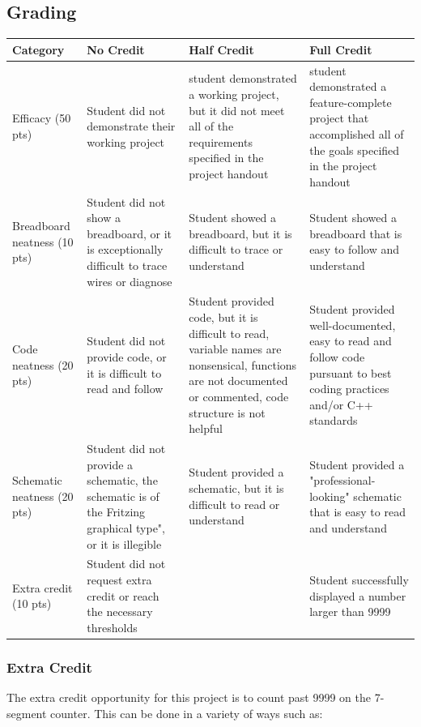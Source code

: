 \documentclass{article}
\begin{document}
    \subsection*{Grading}
    \begin{tabular}{ | p{1in} | p{1.75in} | p{1.75in} | p{1.75in} | }
        \hline
        \textbf{Category} & \textbf{No Credit} & \textbf{Half Credit} & \textbf{Full Credit} \\

        \hline
        Efficacy (50 pts) & 
        Student did not demonstrate their working project & 
        student demonstrated a working project, but it did not meet all of the requirements specified in the project handout & 
        student demonstrated a feature-complete project that accomplished all of the goals specified in the project handout \\
        \hline
        Breadboard neatness (10 pts) & 
        Student did not show a breadboard, or it is exceptionally difficult to trace wires or diagnose &
        Student showed a breadboard, but it is difficult to trace or understand &
        Student showed a breadboard that is easy to follow and understand \\
        \hline
        Code neatness (20 pts) & 
        Student did not provide code, or it is difficult to read and follow &
        Student provided code, but it is difficult to read, variable names are nonsensical, functions are not documented or commented, code structure is not helpful &
        Student provided well-documented, easy to read and follow code pursuant to best coding practices and/or C++ standards \\
        \hline
        Schematic neatness (20 pts) & 
        Student did not provide a schematic, the schematic is of the Fritzing graphical type", or it is illegible &
        Student provided a schematic, but it is difficult to read or understand &
        Student provided a "professional-looking" schematic that is easy to read and understand \\
        \hline
        Extra credit (10 pts) &
        Student did not request extra credit or reach the necessary thresholds & 
        &
        Student successfully displayed a number larger than 9999 \\

        \hline
    \end{tabular}

        \subsubsection*{Extra Credit}
        The extra credit opportunity for this project is to count past 9999 on the 7-segment counter.
        This can be done in a variety of ways such as:
        
\end{document}
